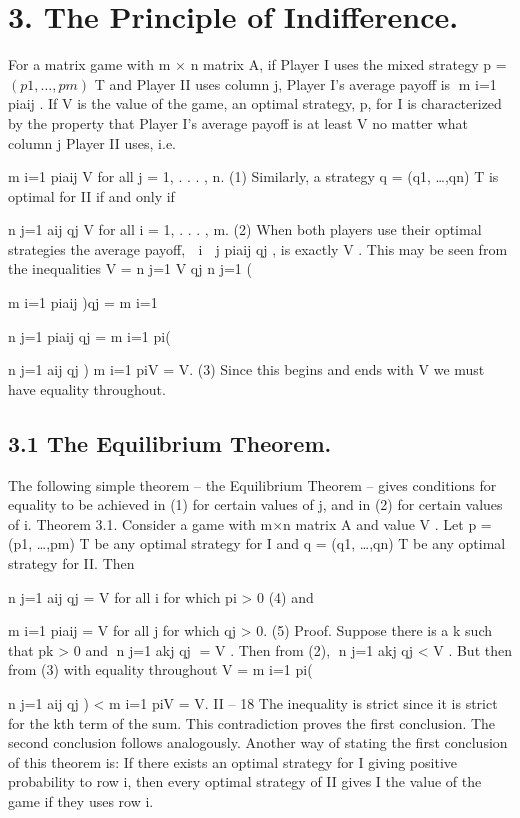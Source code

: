 \documentclass[]{report}
\begin{document}

\section{3. The Principle of Indifference.}
For a matrix game with m × n matrix A, if Player I uses the mixed strategy p =
$(p1, \ldots,pm)$
T and Player II uses column j, Player I’s average payoff is m
i=1 piaij . If V is
the value of the game, an optimal strategy, p, for I is characterized by the property that
Player I’s average payoff is at least V no matter what column j Player II uses, i.e.

m
i=1
piaij \geq V for all j = 1, . . . , n. (1)
Similarly, a strategy q = (q1, \ldots,qn)
T is optimal for II if and only if

n
j=1
aij qj \leq V for all i = 1, . . . , m. (2)
When both players use their optimal strategies the average payoff, 
i

j piaij qj , is exactly
V . This may be seen from the inequalities
V = 
n
j=1
V qj \leq 
n
j=1
(

m
i=1
piaij )qj = 
m
i=1

n
j=1
piaij qj
= 
m
i=1
pi(

n
j=1
aij qj ) \leq 
m
i=1
piV = V.
(3)
Since this begins and ends with V we must have equality throughout.

\subsection{3.1 The Equilibrium Theorem.} The following simple theorem – the Equilibrium
Theorem – gives conditions for equality to be achieved in (1) for certain values of j, and
in (2) for certain values of i.
Theorem 3.1. Consider a game with m×n matrix A and value V . Let p = (p1, \ldots,pm)
T
be any optimal strategy for I and q = (q1, \ldots,qn)
T be any optimal strategy for II. Then

n
j=1
aij qj = V for all i for which pi > 0 (4)
and

m
i=1
piaij = V for all j for which qj > 0. (5)
Proof. Suppose there is a k such that pk > 0 and n
j=1 akj qj = V . Then from (2),
n
j=1 akj qj < V . But then from (3) with equality throughout
V = 
m
i=1
pi(

n
j=1
aij qj ) < 
m
i=1
piV = V.
II – 18
The inequality is strict since it is strict for the kth term of the sum. This contradiction
proves the first conclusion. The second conclusion follows analogously.
Another way of stating the first conclusion of this theorem is: If there exists an optimal
strategy for I giving positive probability to row i, then every optimal strategy of II gives
I the value of the game if they uses row i.
\end{document}
